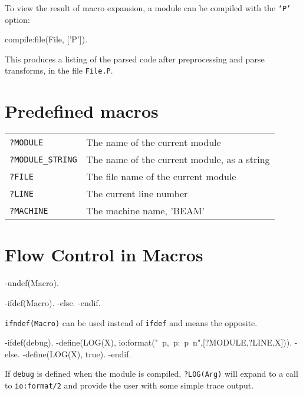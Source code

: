 To view the result of macro expansion, a module can be compiled with
the \texttt{`P'} option:

\begin{erlang}
compile:file(File, ['P']).
\end{erlang}

This produces a listing of the parsed code after preprocessing and
parse transforms, in the file \texttt{File.P}.


\section{Predefined macros}

\begin{center}
\begin{tabular}{|>{\raggedright}p{103pt}|>{\raggedright}p{223pt}|}
\hline
\multicolumn{2}{|p{326pt}|}{P{\large{}redefined} macros}\tabularnewline
\hline
\texttt{?MODULE} & The name of the current module\tabularnewline
\hline
\texttt{?MODULE\_STRING} & The name of the current module, as a string\tabularnewline
\hline
\texttt{?FILE} & The file name of the current module\tabularnewline
\hline
\texttt{?LINE} & The current line number\tabularnewline
\hline
\texttt{?MACHINE} & The machine name, 'BEAM'\tabularnewline
\hline
\end{tabular}
\end{center}


\section{Flow Control in Macros}

\begin{erlang}
-undef(Macro).      %

-ifdef(Macro).
-else.
-endif.
\end{erlang}

\texttt{ifndef(Macro)} can be used instead of \texttt{ifdef} and means
the opposite.

\begin{erlang}
-ifdef(debug).
-define(LOG(X), io:format("{~p,~p}:~p~n",[?MODULE,?LINE,X])).
-else.
-define(LOG(X), true).
-endif.
\end{erlang}

If \texttt{debug} is defined when the module is compiled,
\texttt{?LOG(Arg)} will expand to a call to \texttt{io:format/2} and
provide the user with some simple trace output.


